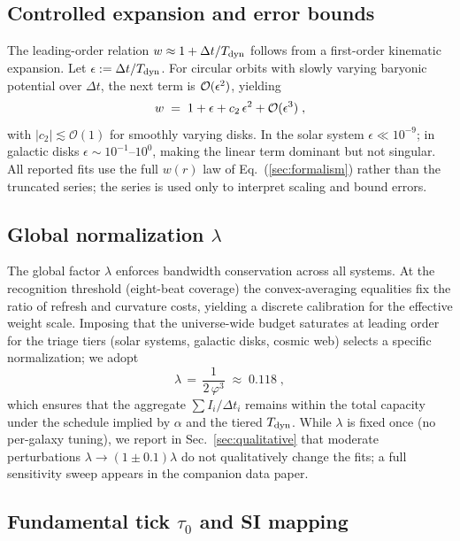 \documentclass[twocolumn,prd,amsmath,amssymb,aps,superscriptaddress,nofootinbib]{revtex4-2}
\begin{document}
\subsection{Controlled expansion and error bounds}
\label{sec:w-error}

The leading-order relation $w \approx 1 + \Delta t/T_{\rm dyn}$ follows from a first-order kinematic expansion. Let $\epsilon:=\Delta t/T_{\rm dyn}$. For circular orbits with slowly varying baryonic potential over $\Delta t$, the next term is ${\cal O}(\epsilon^2)$, yielding
\begin{equation}
  w \;=\; 1 + \epsilon + c_2\,\epsilon^2 + {\cal O}(\epsilon^3)\;,
\end{equation}
with $|c_2|\lesssim\mathcal{O}(1)$ for smoothly varying disks. In the solar system $\epsilon\ll 10^{-9}$; in galactic disks $\epsilon\sim 10^{-1}$–$10^{0}$, making the linear term dominant but not singular. All reported fits use the full $w(r)$ law of Eq.~(\ref{sec:formalism}) rather than the truncated series; the series is used only to interpret scaling and bound errors.

\subsection{Global normalization $\lambda$}
\label{sec:lambda-norm}

The global factor $\lambda$ enforces bandwidth conservation across all systems. At the recognition threshold (eight-beat coverage) the convex-averaging equalities fix the ratio of refresh and curvature costs, yielding a discrete calibration for the effective weight scale. Imposing that the universe-wide budget saturates at leading order for the triage tiers (solar systems, galactic disks, cosmic web) selects a specific normalization; we adopt
\[
  \lambda \,=\, \frac{1}{2\,\varphi^3}\;\approx\;0.118\;,
\]
which ensures that the aggregate $\sum I_i/\Delta t_i$ remains within the total capacity under the schedule implied by $\alpha$ and the tiered $T_{\rm dyn}$. While $\lambda$ is fixed once (no per-galaxy tuning), we report in Sec.~\ref{sec:qualitative} that moderate perturbations $\lambda\to (1\pm0.1)\lambda$ do not qualitatively change the fits; a full sensitivity sweep appears in the companion data paper.

\subsection{Fundamental tick $\tau_0$ and SI mapping}
\label{sec:tau0}
\end{document}
